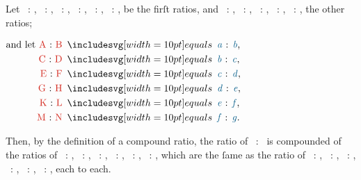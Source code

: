 \documentclass[11pt,preview]{standalone}
\begin{document}
\hfill

\begin{center}
\end{center}

\raggedright Let \redA\ : \redB, \redC\ : \redD, \redE\ : \redF, \redG\ : \redH, \redK\ : \redL, \redM\ : \redN, be the firſt ratios, and \yellowO\ : \yellowP, \yellowQ\ : \yellowR, \yellowS\ : \yellowT, \yellowV\ : \yellowW, \yellowX\ : \yellowY, the other ratios;

\begin{center}
    $\begin{aligned}
            \text{and let \redA\ : \redB} & \bequals \text{\bluea\ : \blueb,} \\
            \text{\redC\ : \redD}         & \bequals \text{\blueb\ : \bluec,} \\
            \text{\redE\ : \redF}         & \bequals \text{\bluec\ : \blued,} \\
            \text{\redG\ : \redH}         & \bequals \text{\blued\ : \bluee,} \\
            \text{\redK\ : \redL}         & \bequals \text{\bluee\ : \bluef,} \\
            \text{\redM\ : \redN}         & \bequals \text{\bluef\ : \blueg.}
        \end{aligned}$
\end{center}

Then, by the definition of a compound ratio, the ratio of \bluea\ : \blueg\ is compounded of the ratios of \bluea\ : \blueb, \blueb\ : \bluec, \bluec\ : \blued, \blued\ : \bluee, \bluee\ : \bluef, \bluef\ : \blueg, which are the ſame as the ratio of \redA\ : \redB, \redC\ : \redD, \redE\ : \redF, \redG\ : \redH, \redK\ : \redL, \redM\ : \redN, each to each.
\end{document}
